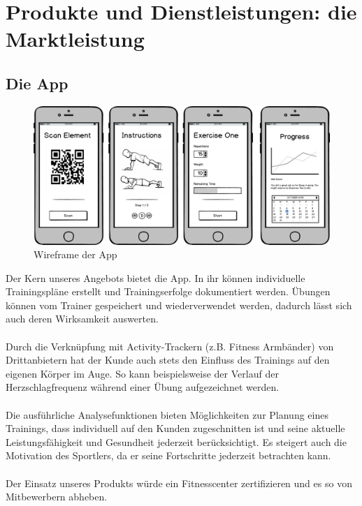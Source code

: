 \clearpage
\section{Produkte und Dienstleistungen: die Marktleistung}

\subsection{Die App}
\begin{figure}[h]
\centering
\includegraphics[width=0.5\linewidth]{images/app}
\caption{Wireframe der App}
\label{fig:app}
\end{figure}
Der Kern unseres Angebots bietet die App. In ihr können individuelle Trainingspläne erstellt und Trainingserfolge dokumentiert werden. Übungen können vom Trainer gespeichert und wiederverwendet werden, dadurch lässt sich auch deren Wirksamkeit auswerten. \\ \\
Durch die Verknüpfung mit Activity-Trackern (z.B. Fitness Armbänder) von Drittanbietern hat der Kunde auch stets den Einfluss des Trainings auf den eigenen Körper im Auge. So kann beispielsweise der Verlauf der Herzschlagfrequenz während einer Übung aufgezeichnet werden. \\ \\
Die ausführliche Analysefunktionen bieten Möglichkeiten zur Planung eines Trainings, dass individuell auf den Kunden zugeschnitten ist und seine aktuelle Leistungsfähigkeit und Gesundheit jederzeit berücksichtigt. Es steigert auch die Motivation des Sportlers, da er seine Fortschritte jederzeit betrachten kann. \\ \\
Der Einsatz unseres Produkts würde ein Fitnesscenter zertifizieren und es so von Mitbewerbern abheben.

